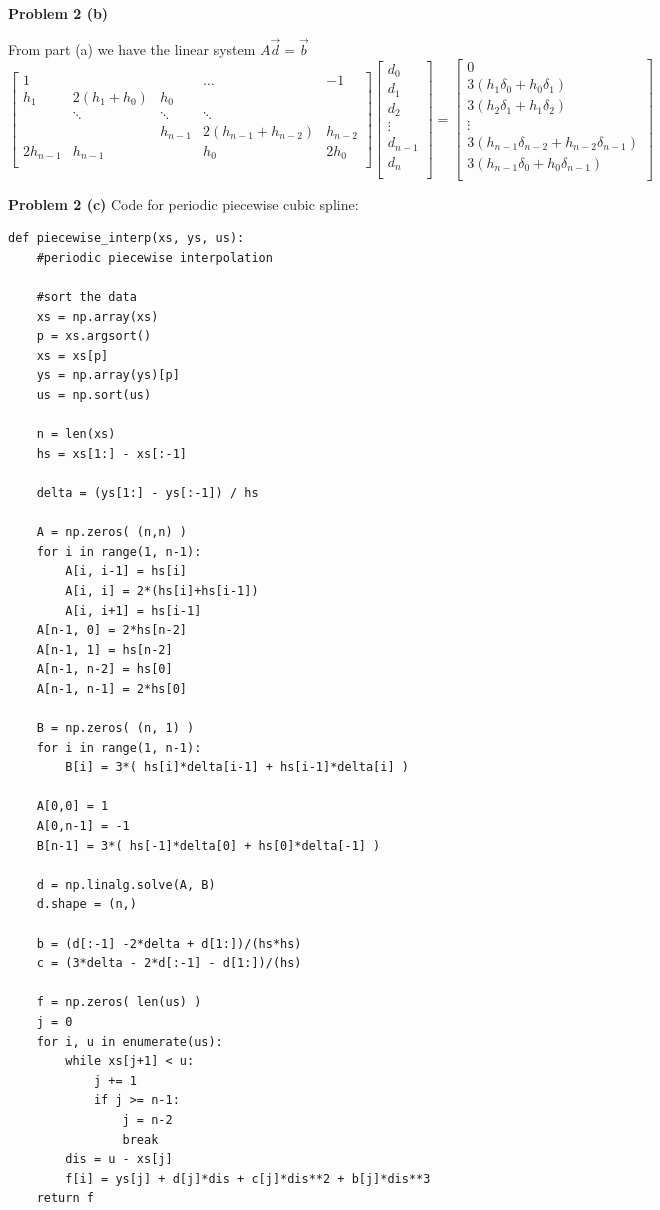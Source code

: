 \documentclass[12pt]{article}
\newcommand{\problem}[1]{\hspace{-4 ex} \large \textbf{Problem #1} }
\begin{document}
\problem{2 (b)}

	From part (a) we have the linear system $A\vec{d} = \vec{b}$
	$$
	\begin{bmatrix}
	1 & & & \dots & -1\\
	h_1 & 2(h_1+h_0) & h_0\\
	& \ddots & \ddots & \ddots \\
	& & h_{n-1} & 2(h_{n-1}+h_{n-2}) & h_{n-2} \\
	2h_{n-1} & h_{n-1} & & h_0 & 2h_0 \\
	\end{bmatrix}
	\begin{bmatrix}
	d_0 \\
	d_1 \\
	d_2 \\
	\vdots \\
	d_{n-1} \\
	d_n \\
	\end{bmatrix}
	=
	\begin{bmatrix}
	0 \\
	3(h_1\delta_{0} + h_{0}\delta_{1}) \\
	3(h_2\delta_{1} + h_{1}\delta_{2}) \\
	\vdots \\
	3(h_{n-1}\delta_{n-2} + h_{n-2}\delta_{n-1}) \\
	3(h_{n-1}\delta_0 + h_0\delta_{n-1}) \\
	\end{bmatrix}	
	$$
	
\problem{2 (c)} Code for periodic piecewise cubic spline:
	\begin{lstlisting}
def piecewise_interp(xs, ys, us):
	#periodic piecewise interpolation
	
	#sort the data
	xs = np.array(xs)
	p = xs.argsort()
	xs = xs[p]
	ys = np.array(ys)[p]
	us = np.sort(us)
	
	n = len(xs)
	hs = xs[1:] - xs[:-1]
	
	delta = (ys[1:] - ys[:-1]) / hs
	
	A = np.zeros( (n,n) )
	for i in range(1, n-1):
		A[i, i-1] = hs[i]
		A[i, i] = 2*(hs[i]+hs[i-1])
		A[i, i+1] = hs[i-1]
	A[n-1, 0] = 2*hs[n-2]
	A[n-1, 1] = hs[n-2]
	A[n-1, n-2] = hs[0]
	A[n-1, n-1] = 2*hs[0]
	
	B = np.zeros( (n, 1) )
	for i in range(1, n-1):
		B[i] = 3*( hs[i]*delta[i-1] + hs[i-1]*delta[i] )
	
	A[0,0] = 1
	A[0,n-1] = -1
	B[n-1] = 3*( hs[-1]*delta[0] + hs[0]*delta[-1] )
	
	d = np.linalg.solve(A, B)
	d.shape = (n,)
	
	b = (d[:-1] -2*delta + d[1:])/(hs*hs)
	c = (3*delta - 2*d[:-1] - d[1:])/(hs)
	
	f = np.zeros( len(us) )
	j = 0
	for i, u in enumerate(us):
		while xs[j+1] < u:
			j += 1
			if j >= n-1:
				j = n-2
				break
		dis = u - xs[j] 
		f[i] = ys[j] + d[j]*dis + c[j]*dis**2 + b[j]*dis**3
	return f
	\end{lstlisting}
	
\end{document}
